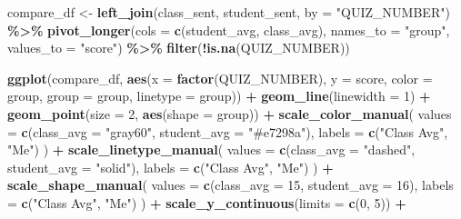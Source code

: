 \documentclass[
]{article}
\newenvironment{Shaded}{\begin{snugshade}}{\end{snugshade}}
\newcommand{\AttributeTok}[1]{\textcolor[rgb]{0.13,0.29,0.53}{#1}}
\newcommand{\DecValTok}[1]{\textcolor[rgb]{0.00,0.00,0.81}{#1}}
\newcommand{\FunctionTok}[1]{\textcolor[rgb]{0.13,0.29,0.53}{\textbf{#1}}}
\newcommand{\NormalTok}[1]{#1}
\newcommand{\OtherTok}[1]{\textcolor[rgb]{0.56,0.35,0.01}{#1}}
\newcommand{\SpecialCharTok}[1]{\textcolor[rgb]{0.81,0.36,0.00}{\textbf{#1}}}
\newcommand{\StringTok}[1]{\textcolor[rgb]{0.31,0.60,0.02}{#1}}
\begin{document}
\begin{Shaded}
\begin{Highlighting}[]
\NormalTok{    compare\_df }\OtherTok{\textless{}{-}} \FunctionTok{left\_join}\NormalTok{(class\_sent, student\_sent, }\AttributeTok{by =} \StringTok{"QUIZ\_NUMBER"}\NormalTok{) }\SpecialCharTok{\%\textgreater{}\%}
      \FunctionTok{pivot\_longer}\NormalTok{(}\AttributeTok{cols =} \FunctionTok{c}\NormalTok{(student\_avg, class\_avg), }\AttributeTok{names\_to =} \StringTok{"group"}\NormalTok{, }\AttributeTok{values\_to =} \StringTok{"score"}\NormalTok{) }\SpecialCharTok{\%\textgreater{}\%}
      \FunctionTok{filter}\NormalTok{(}\SpecialCharTok{!}\FunctionTok{is.na}\NormalTok{(QUIZ\_NUMBER))}

    \FunctionTok{ggplot}\NormalTok{(compare\_df, }\FunctionTok{aes}\NormalTok{(}\AttributeTok{x =} \FunctionTok{factor}\NormalTok{(QUIZ\_NUMBER), }\AttributeTok{y =}\NormalTok{ score, }\AttributeTok{color =}\NormalTok{ group, }\AttributeTok{group =}\NormalTok{ group, }\AttributeTok{linetype =}\NormalTok{ group)) }\SpecialCharTok{+}
      \FunctionTok{geom\_line}\NormalTok{(}\AttributeTok{linewidth =} \DecValTok{1}\NormalTok{) }\SpecialCharTok{+}
      \FunctionTok{geom\_point}\NormalTok{(}\AttributeTok{size =} \DecValTok{2}\NormalTok{, }\FunctionTok{aes}\NormalTok{(}\AttributeTok{shape =}\NormalTok{ group)) }\SpecialCharTok{+}
      \FunctionTok{scale\_color\_manual}\NormalTok{(}
        \AttributeTok{values =} \FunctionTok{c}\NormalTok{(}\AttributeTok{class\_avg =} \StringTok{"gray60"}\NormalTok{, }\AttributeTok{student\_avg =} \StringTok{"\#e7298a"}\NormalTok{), }
        \AttributeTok{labels =} \FunctionTok{c}\NormalTok{(}\StringTok{"Class Avg"}\NormalTok{, }\StringTok{"Me"}\NormalTok{)}
\NormalTok{      ) }\SpecialCharTok{+}
      \FunctionTok{scale\_linetype\_manual}\NormalTok{(}
        \AttributeTok{values =} \FunctionTok{c}\NormalTok{(}\AttributeTok{class\_avg =} \StringTok{"dashed"}\NormalTok{, }\AttributeTok{student\_avg =} \StringTok{"solid"}\NormalTok{),}
        \AttributeTok{labels =} \FunctionTok{c}\NormalTok{(}\StringTok{"Class Avg"}\NormalTok{, }\StringTok{"Me"}\NormalTok{)}
\NormalTok{      ) }\SpecialCharTok{+}
      \FunctionTok{scale\_shape\_manual}\NormalTok{(}
        \AttributeTok{values =} \FunctionTok{c}\NormalTok{(}\AttributeTok{class\_avg =} \DecValTok{15}\NormalTok{, }\AttributeTok{student\_avg =} \DecValTok{16}\NormalTok{),}
        \AttributeTok{labels =} \FunctionTok{c}\NormalTok{(}\StringTok{"Class Avg"}\NormalTok{, }\StringTok{"Me"}\NormalTok{)}
\NormalTok{      ) }\SpecialCharTok{+}
      \FunctionTok{scale\_y\_continuous}\NormalTok{(}\AttributeTok{limits =} \FunctionTok{c}\NormalTok{(}\DecValTok{0}\NormalTok{, }\DecValTok{5}\NormalTok{)) }\SpecialCharTok{+}

\end{Highlighting}
\end{Shaded}
\end{document}
